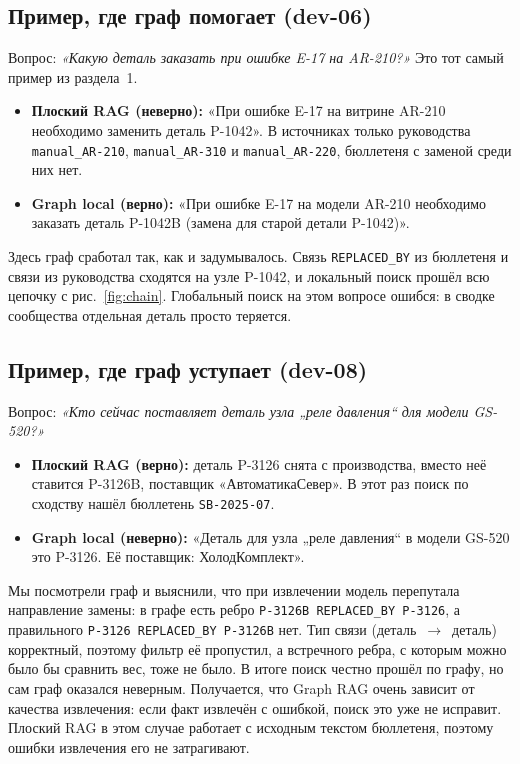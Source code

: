 \documentclass[a4paper,12pt]{article}
\newcommand{\code}[1]{\texttt{#1}}
\begin{document}
\subsection{Пример, где граф помогает (dev-06)}

Вопрос: \emph{«Какую деталь заказать при ошибке E-17 на AR-210?»} Это тот самый пример из раздела~1.

\begin{itemize}
\item \textbf{Плоский RAG (неверно):} «При ошибке E-17 на витрине AR-210 необходимо заменить деталь P-1042». В источниках только руководства \code{manual\_AR-210}, \code{manual\_AR-310} и \code{manual\_AR-220}, бюллетеня с заменой среди них нет.
\item \textbf{Graph local (верно):} «При ошибке E-17 на модели AR-210 необходимо заказать деталь P-1042B (замена для старой детали P-1042)».
\end{itemize}

Здесь граф сработал так, как и задумывалось. Связь \code{REPLACED\_BY} из бюллетеня и связи из руководства сходятся на узле P-1042, и локальный поиск прошёл всю цепочку с рис.~\ref{fig:chain}. Глобальный поиск на этом вопросе ошибся: в сводке сообщества отдельная деталь просто теряется.

\subsection{Пример, где граф уступает (dev-08)}

Вопрос: \emph{«Кто сейчас поставляет деталь узла „реле давления“ для модели GS-520?»}

\begin{itemize}
\item \textbf{Плоский RAG (верно):} деталь P-3126 снята с производства, вместо неё ставится P-3126B, поставщик «АвтоматикаСевер». В этот раз поиск по сходству нашёл бюллетень \code{SB-2025-07}.
\item \textbf{Graph local (неверно):} «Деталь для узла „реле давления“ в модели GS-520 это P-3126. Её поставщик: ХолодКомплект».
\end{itemize}

Мы посмотрели граф и выяснили, что при извлечении модель перепутала направление замены: в графе есть ребро \code{P-3126B~REPLACED\_BY~P-3126}, а правильного \code{P-3126~REPLACED\_BY~P-3126B} нет. Тип связи (деталь~$\to$~деталь) корректный, поэтому фильтр её пропустил, а встречного ребра, с которым можно было бы сравнить вес, тоже не было. В итоге поиск честно прошёл по графу, но сам граф оказался неверным. Получается, что Graph RAG очень зависит от качества извлечения: если факт извлечён с ошибкой, поиск это уже не исправит. Плоский RAG в этом случае работает с исходным текстом бюллетеня, поэтому ошибки извлечения его не затрагивают.
\end{document}
